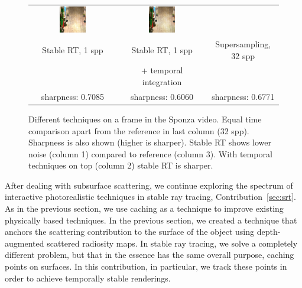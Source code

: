 \begin{figure}[t]
\begin{tabular}{@{}c@{}c@{}@{}c@{}}
	 	 \includegraphics[width=0.32\textwidth]{figures/srt_1_ti_rect_370_300_300_300_frame_211.png} &
	  \includegraphics[width=0.32\textwidth]{figures/ss_32x_rect_370_300_300_300_frame_211.png}
 \\
Stable RT, 1 spp & Stable RT, 1 spp & Supersampling, 32 spp \\
 & + temporal integration &  \\
sharpness: 0.7085 & sharpness: 0.6060 & sharpness: 0.6771 \\[-1.5ex]
\end{tabular}
\caption{Different techniques on a frame in the Sponza video. Equal time comparison apart from the reference in last column (32 spp). Sharpness is also shown (higher is sharper). Stable RT shows lower noise (column 1) compared to reference (column 3). With temporal techniques on top (column 2) stable RT is sharper.  }
\label{fig:sponza_video_frame}
\end{figure}

After dealing with subsurface scattering, we continue exploring the spectrum of interactive photorealistic techniques in stable ray tracing, Contribution~\ref{sec:srt}. As in the previous section, we use caching as a technique to improve existing physically based techniques. In the previous section, we created a technique that anchors the scattering contribution to the surface of the object using depth-augmented scattered radiosity maps. In stable ray tracing, we solve a completely different problem, but that in the essence has the same overall purpose, caching points on surfaces. In this contribution, in particular, we track these points in order to achieve temporally stable renderings. 

